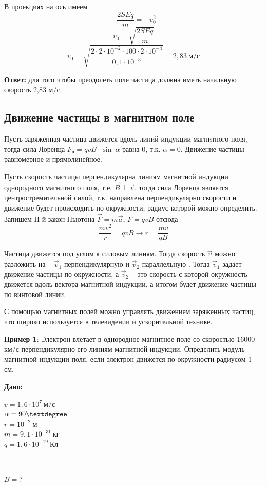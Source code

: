 \documentclass[a5paper, 10pt]{diss_4}
\newcommand{\TNF}{$\vec{F}=m\vec{a}$}
\renewcommand{\'}{\,'}
\begin{document}
В проекциях на ось имеем
\[
-\frac{2SEq}{m}=-v^2_0
\]
\[
v_0=\sqrt{\frac{2SEq}{m}}
\]
\[
v_0=\sqrt{\frac{2\cdot2\cdot10^{-2}\cdot100\cdot2\cdot10^{-4}}{0,1\cdot10^{-3}}}=2,83\ м/с
\]

\textbf{Ответ:}  для того чтобы преодолеть поле частица должна иметь начальную скорость 2,83 м/с.


\subsection{Движение частицы в магнитном поле}

Пусть заряженная частица движется вдоль линий индукции магнитного поля, тогда сила Лоренца $F_л=qvB\cdot \sin\ \alpha$
равна 0, т.к. $\alpha=0$. Движение частицы --- равномерное и прямолинейное.

Пусть скорость частицы перпендикулярна линиям магнитной индукции однородного магнитного поля, т.е. $\vec{B}\perp\vec{v}$,
тогда сила Лоренца является центростремительной силой, т.к. направлена перпендикулярно скорости и движение
будет происходить по окружности, радиус которой можно определить. Запишем II-й закон Ньютона \TNF,  $F=qvB$  отсюда
\[
\frac{mv^2}{r}=qvB\to
r=\frac{mv}{qB}
\]

Частица движется под углом к силовым линиям. Тогда скорость $\vec{v}$ можно разложить на -- $\vec{v}_1$ перпендикулярную и
$\vec{v}_2$ параллельную . Тогда $\vec{v}_1$ задает движение  частицы по окружности, а $\vec{v}_2$ --  это скорость с которой окружность движется вдоль вектора магнитной индукции, а итогом будет движение частицы по винтовой линии.

С помощью магнитных полей можно управлять движением заряженных частиц, что широко используется в телевидении и ускорительной технике.

\textbf{Пример 1}: Электрон влетает в однородное магнитное поле со скоростью 16000 км/с перпендикулярно его линиям магнитной индукции. Определить модуль магнитной индукции поля, если электрон движется по окружности радиусом 1 см.

\hspace{1cm}\textbf{Дано:}\hspace{.3cm}
\parbox[t]{4cm}{
$v = 1,6\cdot10^{7}\ м/с$\\
$\alpha = 90\textdegree$\\
$r = 10^{-2}\ м$\\
$m = 9,1\cdot10^{-31}\ кг$\\
$q = 1,6\cdot10^{-19}\ Кл$\\
\rule{4cm}{.4pt}\\
$B = ?$\\
}
\end{document}
